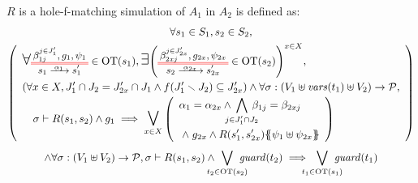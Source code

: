 \documentclass{article}
\begin{document}
\begin{defi}
\(R\) is a hole-f-matching simulation of \(A_1\) in \(A_2\) is defined as:
\begin{multline*}
	\forall s_1 \in S_1, s_2 \in S_2, \\
	\mpar{\renewcommand\arraystretch{1.4}\everymath{\displaystyle}\begin{array}{l}
		\bigsymb{\forall} \OTx{1}{}{1}{1} \in \fOT{s_1}, \bigsymb{\exists} \mpar{\OTx{2}{x}{2x}{2x} \in \fOT{s_2}}^{x \in X}, \\
		\mpar{\forall x \in X, J'_1 \cap J_2 = J'_{2x} \cap J_1 \wedge f\mpar{J'_1 \setminus J_2} \subseteq J'_{2x}} \wedge \forall \sigma: \mpar{V_1 \uplus \fvars{t_1} \uplus V_2} \to \values, \\
		\quad \sigma \vdash R\mpar{s_1, s_2} \wedge g_1 \implies \operatorname*{\bigsymb{\bigvee}}_{x \in X} \mpar{\begin{array}{l}
			\alpha_1 = \alpha_{2x} \wedge \bigwedge_\subbox{j \in J'_1 \cap J_2} \beta_{1j} = \beta_{2xj} \\
			\nwedge g_{2x} \wedge R\mpar{s'_1, s'_{2x}}\psubst{\psi_1 \uplus \psi_{2x}}
		\end{array}} \\
	\end{array}} \\
	\wedge \forall \sigma: \mpar{V_1 \uplus V_2} \to \values, \sigma \vdash R\mpar{s_1, s_2} \wedge \bigvee_\subbox{t_2 \in \fOT{s_2}} \fguard{t_2} \implies \bigvee_\subbox{t_1 \in \fOT{s_1}} \fguard{t_1}
\end{multline*}
\end{defi}
\end{document}
